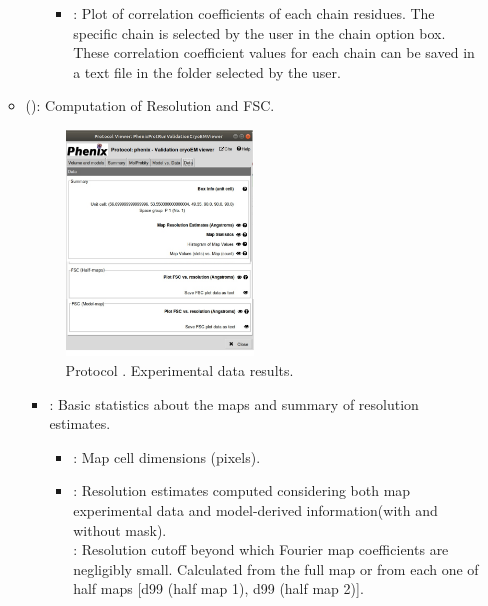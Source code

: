 \begin{itemize}
\begin{itemize}
\begin{itemize}
\begin{itemize}
           \item {}: Plot of correlation coefficients of each chain residues. The specific chain is selected by the user in the chain option box. These correlation coefficient values for each chain can be saved in a text file in the folder selected by the user.
         \end{itemize}
        \end{itemize}
      \item {} (): Computation of Resolution  and FSC.
       \begin{figure}[H]
         \centering 
         \captionsetup{width=.9\linewidth} 
         \includegraphics[width=0.50\textwidth]{Images_appendix/Fig204.pdf}
         \caption{Protocol . Experimental data results.}
         \label{fig:validationCryoEM_protocol_6}
        \end{figure}
        \begin{itemize}
         \item {}: Basic statistics about the maps and summary of resolution estimates.
         \begin{itemize}
          \item {}: Map cell dimensions (pixels).
          \item {}: Resolution estimates computed considering both map experimental data and model-derived information(with and without mask)\setlength{\parindent}{12pt}.\\
            : Resolution cutoff beyond which Fourier map coefficients are negligibly small. Calculated from the full map or from each one of half maps [d99 (half map 1), d99 (half map 2)].\\

\end{itemize}
\end{itemize}
\end{itemize}
\end{itemize}
